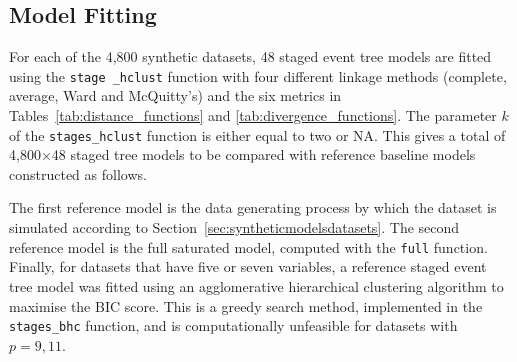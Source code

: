 \documentclass[preprint,12pt]{elsarticle}
\newcommand{\blue}{\color{blue}}
\begin{document}




\subsection{Model Fitting}
\label{sec:model-fitting}
 
For each of the 4,800 synthetic datasets,
48 staged event tree models are fitted using  the \texttt{stage \_hclust} function 
with four different linkage methods (complete, average, Ward and McQuitty’s) and the six metrics in Tables~\ref{tab:distance_functions} and \ref{tab:divergence_functions}.
The parameter $k$  of the \texttt{stages\_hclust} function is either equal to two or NA.
This gives a total of 4,800$\times$48 staged tree models to be compared with reference baseline models constructed as follows.


The first reference model is the data generating process by which the dataset is simulated according to Section~\ref{sec:syntheticmodelsdatasets}. 
The second reference model is the full saturated model, computed with the \texttt{full} function.
Finally, for datasets that have five or seven variables, a { reference} staged event tree model was fitted using an agglomerative hierarchical clustering algorithm to maximise the BIC score.  
This is a greedy search method, implemented in the \texttt{stages\_bhc} function, and is computationally unfeasible for  datasets with $p=9,11$.
\end{document}
